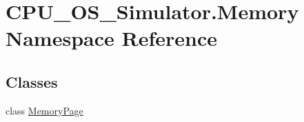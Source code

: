 \hypertarget{namespace_c_p_u___o_s___simulator_1_1_memory}{}\section{C\+P\+U\+\_\+\+O\+S\+\_\+\+Simulator.\+Memory Namespace Reference}
\label{namespace_c_p_u___o_s___simulator_1_1_memory}
\subsection*{Classes}
\begin{DoxyCompactItemize}
\item 
class \hyperlink{class_c_p_u___o_s___simulator_1_1_memory_1_1_memory_page}{Memory\+Page}
\end{DoxyCompactItemize}

